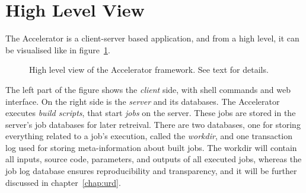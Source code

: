 




\section{High Level View}
The Accelerator is a client-server based application, and from a high
level, it can be visualised like in figure~\ref{fig:overview}.

\begin{figure}[h!]
  \begin{center}
    
    \caption{High level view of the Accelerator framework.  See text
      for details.}
    \label{fig:overview}
  \end{center}
\end{figure}

The left part of the figure shows the \emph{client} side, with shell
commands and web interface.  On the right side is the \emph{server}
and its databases.  The Accelerator executes \textsl{build scripts},
that start \textsl{jobs} on the server.  These jobs are stored in the
server's job databases for later retreival.  There are two databases,
one for storing everything related to a job's execution, called the
\textsl{workdir}, and one transaction log used for storing
meta-information about built jobs.  The workdir will contain all
inputs, source code, parameters, and outputs of all executed jobs,
whereas the job log database ensures reproducibility and transparency,
and it will be further discussed in chapter~\ref{chap:urd}.


